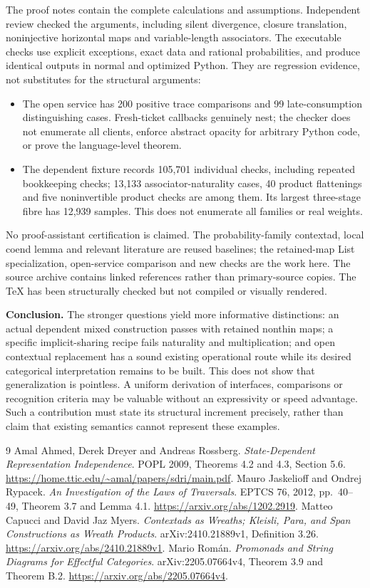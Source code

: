 \documentclass[11pt,a4paper]{article}
\begin{document}
The proof notes contain the complete calculations and assumptions. Independent
review checked the arguments, including silent divergence, closure translation,
noninjective horizontal maps and variable-length associators. The executable
checks use explicit exceptions, exact data and rational probabilities, and
produce identical outputs in normal and optimized Python. They are regression
evidence, not substitutes for the structural arguments:
\begin{itemize}
\item The open service has 200 positive trace comparisons and 99 late-consumption
distinguishing cases. Fresh-ticket callbacks genuinely nest; the checker does
not enumerate all clients, enforce abstract opacity for arbitrary Python code,
or prove the language-level theorem.
\item The dependent fixture records 105,701 individual checks, including repeated
bookkeeping checks; 13,133 associator-naturality cases, 40 product flattenings
and five noninvertible product checks are among them. Its largest three-stage
fibre has 12,939 samples. This does not enumerate all families or real weights.
\end{itemize}

No proof-assistant certification is claimed. The probability-family contextad,
local coend lemma and relevant literature are reused baselines; the retained-map
List specialization, open-service comparison and new checks are the work here.
The source archive contains linked references rather than primary-source copies.
The TeX has been structurally checked but not compiled or visually rendered.

\textbf{Conclusion.} The stronger questions yield more informative distinctions:
an actual dependent mixed construction passes with retained nonthin maps; a
specific implicit-sharing recipe fails naturality and multiplication; and open
contextual replacement has a sound existing operational route while its desired
categorical interpretation remains to be built. This does not show that
generalization is pointless. A uniform derivation of interfaces, comparisons or
recognition criteria may be valuable without an expressivity or speed advantage.
Such a contribution must state its structural increment precisely, rather than
claim that existing semantics cannot represent these examples.

\begin{thebibliography}{9}
 Amal Ahmed, Derek Dreyer and Andreas Rossberg.
\emph{State-Dependent Representation Independence}. POPL 2009,
Theorems 4.2 and 4.3, Section 5.6.
\url{https://home.ttic.edu/~amal/papers/sdri/main.pdf}.
 Mauro Jaskelioff and Ondrej Rypacek.
\emph{An Investigation of the Laws of Traversals}. EPTCS 76, 2012,
pp.\ 40--49, Theorem 3.7 and Lemma 4.1.
\url{https://arxiv.org/abs/1202.2919}.
 Matteo Capucci and David Jaz Myers.
\emph{Contextads as Wreaths; Kleisli, Para, and Span Constructions as Wreath Products}.
arXiv:2410.21889v1, Definition 3.26.
\url{https://arxiv.org/abs/2410.21889v1}.
 Mario Rom\'an.
\emph{Promonads and String Diagrams for Effectful Categories}.
arXiv:2205.07664v4, Theorem 3.9 and Theorem B.2.
\url{https://arxiv.org/abs/2205.07664v4}.
\end{thebibliography}
\end{document}
